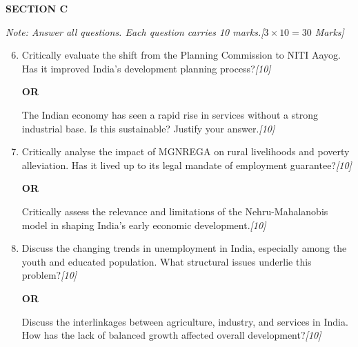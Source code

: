 \documentclass[11pt,a4paper]{article}
\newcommand{\pts}[1]{\hfill   \textit{[#1]}}
\begin{document}
\centerline{   \textbf{SECTION C}}
\smallskip



\noindent   \textit{Note: Answer all questions. Each question carries 10 marks.\hfill [$3  \times 10 = 30$ Marks]}


\begin{enumerate}[label=   \textbf{\arabic*.}]
    \setcounter{enumi}{5}
    \item Critically evaluate the shift from the Planning Commission to NITI Aayog. Has it improved India's development planning process?\pts{10}
    
\begin{center}   \textbf{OR}\end{center}
    The Indian economy has seen a rapid rise in services without a strong industrial base. Is this sustainable? Justify your answer.\pts{10}

    \item Critically analyse the impact of MGNREGA on rural livelihoods and poverty alleviation. Has it lived up to its legal mandate of employment guarantee?\pts{10}
    
\begin{center}   \textbf{OR}\end{center}
    Critically assess the relevance and limitations of the Nehru-Mahalanobis model in shaping India's early economic development.\pts{10}

    \item Discuss the changing trends in unemployment in India, especially among the youth and educated population. What structural issues underlie this problem?\pts{10}
    
\begin{center}   \textbf{OR}\end{center}
    Discuss the interlinkages between agriculture, industry, and services in India. How has the lack of balanced growth affected overall development?\pts{10}
\end{enumerate}
\end{document}
